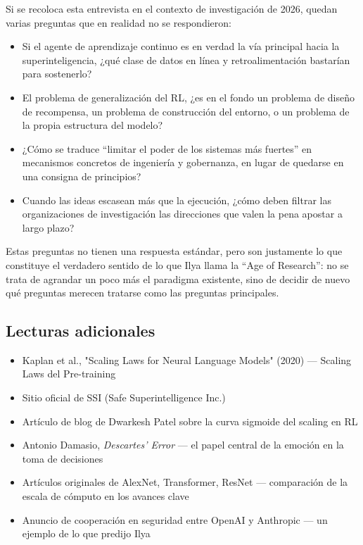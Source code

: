 \documentclass[a4paper]{article}
\begin{document}
Si se recoloca esta entrevista en el contexto de investigación de 2026, quedan varias preguntas que en realidad no se respondieron:
\begin{itemize}
    \item Si el agente de aprendizaje continuo es en verdad la vía principal hacia la superinteligencia, ¿qué clase de datos en línea y retroalimentación bastarían para sostenerlo?
    \item El problema de generalización del RL, ¿es en el fondo un problema de diseño de recompensa, un problema de construcción del entorno, o un problema de la propia estructura del modelo?
    \item ¿Cómo se traduce ``limitar el poder de los sistemas más fuertes'' en mecanismos concretos de ingeniería y gobernanza, en lugar de quedarse en una consigna de principios?
    \item Cuando las ideas escasean más que la ejecución, ¿cómo deben filtrar las organizaciones de investigación las direcciones que valen la pena apostar a largo plazo?
\end{itemize}

Estas preguntas no tienen una respuesta estándar, pero son justamente lo que constituye el verdadero sentido de lo que Ilya llama la ``Age of Research'': no se trata de agrandar un poco más el paradigma existente, sino de decidir de nuevo qué preguntas merecen tratarse como las preguntas principales.

\subsection{Lecturas adicionales}

\begin{itemize}
    \item Kaplan et al., "Scaling Laws for Neural Language Models" (2020) --- Scaling Laws del Pre-training
    \item Sitio oficial de SSI (Safe Superintelligence Inc.)
    \item Artículo de blog de Dwarkesh Patel sobre la curva sigmoide del scaling en RL
    \item Antonio Damasio, \textit{Descartes' Error} --- el papel central de la emoción en la toma de decisiones
    \item Artículos originales de AlexNet, Transformer, ResNet --- comparación de la escala de cómputo en los avances clave
    \item Anuncio de cooperación en seguridad entre OpenAI y Anthropic --- un ejemplo de lo que predijo Ilya
\end{itemize}

\end{document}
